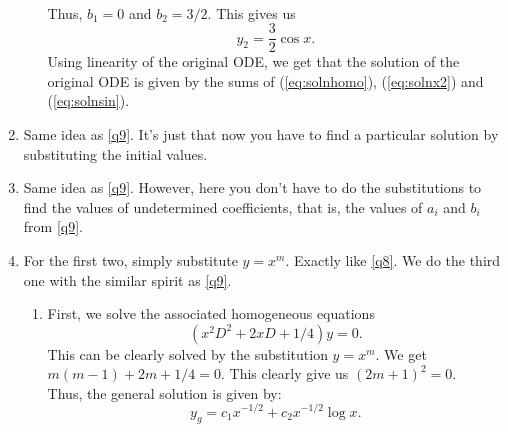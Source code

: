 \documentclass{article}
\begin{document}
\begin{enumerate}[label = Q.\arabic*.]
\begin{enumerate}[start = 8, label = (\roman*)]
\begin{align*}
		\end{align*}
		Thus, $b_1 = 0$ and $b_2 = 3/2.$ This gives us
		\begin{equation} \label{eq:solnsin}
			y_2 = \frac{3}{2}\cos x.
		\end{equation}
		Using linearity of the original ODE, we get that the solution of the original ODE is given by the sums of (\ref{eq:solnhomo}), (\ref{eq:solnx2}) and (\ref{eq:solnsin}).
	\end{enumerate}
	\item Same idea as \ref{q9}. It's just that now you have to find a particular solution by substituting the initial values.
	\item Same idea as \ref{q9}. However, here you don't have to do the substitutions to find the values of undetermined coefficients, that is, the values of $a_i$ and $b_i$ from \ref{q9}.
	\item For the first two, simply substitute $y = x^m.$ Exactly like \ref{q8}. We do the third one with the similar spirit as \ref{q9}.
	\begin{enumerate}[start = 3, label = (\roman*)] 
		\item First, we solve the associated homogeneous equations
		\begin{equation*}
		 	(x^2D^2 + 2xD + 1/4)y = 0.
		\end{equation*} 
		This can be clearly solved by the substitution $y = x^{m}.$ We get $m(m - 1) + 2m + 1/4 = 0.$ This clearly give us $(2m + 1)^2 = 0.$\\
		Thus, the general solution is given by:
		\begin{equation*}
		y_g = c_1x^{-1/2} + c_2x^{-1/2}\log x.
		\end{equation*}
			

\end{enumerate}
\end{enumerate}
\end{document}
